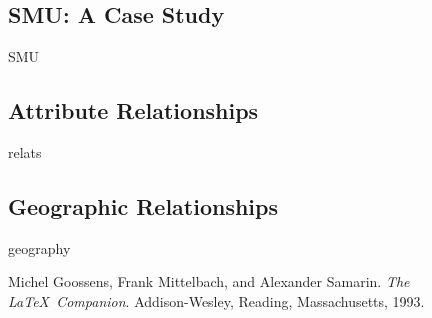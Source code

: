 \documentclass[12pt]{article}
\begin{document}
\subsection{SMU: A Case Study}
SMU

\subsection{Attribute Relationships}
relats

\subsection{Geographic Relationships}
geography


\begin{thebibliography}{9}
Michel Goossens, Frank Mittelbach, and Alexander Samarin.
\textit{The \LaTeX\ Companion}.
Addison-Wesley, Reading, Massachusetts, 1993.
\end{thebibliography}
\end{document}
